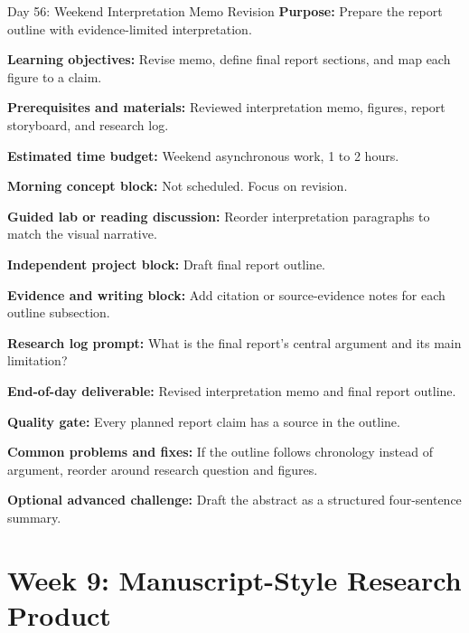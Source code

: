 \begin{dailybox}{Day 56: Weekend Interpretation Memo Revision}
\textbf{Purpose:} Prepare the report outline with evidence-limited interpretation.

\textbf{Learning objectives:} Revise memo, define final report sections, and map each figure to a claim.

\textbf{Prerequisites and materials:} Reviewed interpretation memo, figures, report storyboard, and research log.

\textbf{Estimated time budget:} Weekend asynchronous work, 1 to 2 hours.

\textbf{Morning concept block:} Not scheduled. Focus on revision.

\textbf{Guided lab or reading discussion:} Reorder interpretation paragraphs to match the visual narrative.

\textbf{Independent project block:} Draft final report outline.

\textbf{Evidence and writing block:} Add citation or source-evidence notes for each outline subsection.

\textbf{Research log prompt:} What is the final report's central argument and its main limitation?

\textbf{End-of-day deliverable:} Revised interpretation memo and final report outline.

\textbf{Quality gate:} Every planned report claim has a source in the outline.

\textbf{Common problems and fixes:} If the outline follows chronology instead of argument, reorder around research question and figures.

\textbf{Optional advanced challenge:} Draft the abstract as a structured four-sentence summary.
\end{dailybox}

\section{Week 9: Manuscript-Style Research Product}

